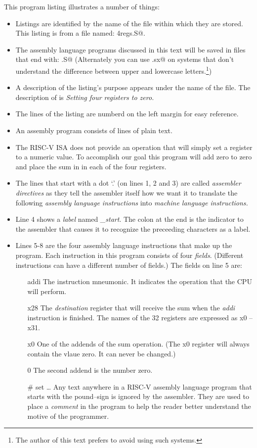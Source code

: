 This program listing illustrates a number of things: 
\begin{itemize}
\item Listings are identified by the name of the file within which
	they are stored.  This listing is from a file named: \verb@zero4regs.S@.
\item The assembly language programs discussed in this text will be saved
	in files that end with: \verb@.S@  (Alternately you can use \verb@.sx@ 
	on systems that don't understand the difference between upper and 
	lowercase letters.\footnote{The author of this text prefers to avoid
	using such systems.})
\item A description of the listing's purpose appears under the name of the
	file.  The description of  is 
	{\em Setting four registers to zero.}
\item The lines of the listing are numberd on the left margin for
	easy reference.
\item An assembly program consists of lines of plain text.
\item The RISC-V ISA does not provide an operation that will simply 
	set a register to a numeric value.  To accomplish our goal this
	program will add zero to zero and place the sum in in each of the
	four registers.
\item The lines that start with a dot `.' (on lines 1, 2 and 3) are 
	called {\em assembler directives} as they tell the assembler itself
	how we want it to translate the following {\em assembly language instructions} 
	into {\em machine language instructions.}  
\item Line 4 shows a {\em label} named {\em \_start}.  The colon
	at the end is the indicator to the assembler that causes it to
	recognize the preceeding characters as a label.
\item Lines 5-8 are the four assembly language instructions that
	make up the program.  Each instruction in this program
	consists of four {\em fields}.  (Different instructions can have 
	a different number of fields.)  The fields on line 5 are:

	\begin{itemize}
	\item [addi] The instruction mneumonic.  It indicates the operation 
		that the CPU will perform.
	\item [x28] The {\em destination} register that will receive the 
		sum when the {\em addi} instruction is finished.  The names of
		the 32 registers are expressed as x0 -- x31.
	\item [x0] One of the addends of the sum operation.  (The x0 register
		will always contain the vlaue zero.  It can never be changed.)
	\item [0] The second addend is the number zero.
		\item [\# set \ldots] Any text anywhere in a RISC-V assembly language
	program that starts with the pound--sign is ignored by the assembler.
			They are used to place a {\em comment} in the program to help
	the reader better understand the motive of the programmer.
	\end{itemize}
\end{itemize}


